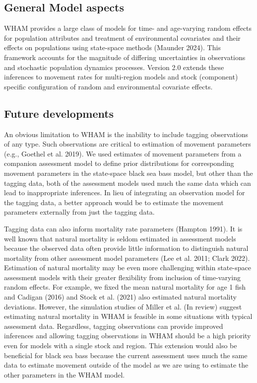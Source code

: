 \documentclass[
]{article}
\begin{document}
\hypertarget{general-model-aspects}{%
\subsection*{General Model aspects}\label{general-model-aspects}}

WHAM provides a large class of models for time- and age-varying random
effects for population attributes and treatment of environmental
covariates and their effects on populations using state-space methods
(Maunder 2024). This framework accounts for the magnitude of differing
uncertainties in observations and stochastic population dynamics
processes. Version 2.0 extends these inferences to movement rates for
multi-region models and stock (component) specific configuration of
random and environmental covariate effects.

\hypertarget{future-developments}{%
\subsection*{Future developments}\label{future-developments}}

An obvious limitation to WHAM is the inability to include tagging
observations of any type. Such observations are critical to estimation
of movement parameters (e.g., Goethel et al. 2019). We used estimates of
movement parameters from a companion assessment model to define prior
distributions for corresponding movement parameters in the state-space
black sea bass model, but other than the tagging data, both of the
assessment models used much the same data which can lead to
inappropriate inferences. In lieu of integrating an observation model
for the tagging data, a better approach would be to estimate the
movement parameters externally from just the tagging data.

Tagging data can also inform mortality rate parameters (Hampton 1991).
It is well known that natural mortality is seldom estimated in
assessment models because the observed data often provide little
information to distinguish natural mortality from other assessment model
parameters (Lee et al. 2011; Clark 2022). Estimation of natural
mortality may be even more challenging within state-space assessment
models with their greater flexibility from inclusion of time-varying
random effects. For example, we fixed the mean natural mortality for age
1 fish and Cadigan (2016) and Stock et al. (2021) also estimated natural
mortality deviations. However, the simulation studies of Miller et al.
(In review) suggest estimating natural mortality in WHAM is feasible in
some situations with typical assessment data. Regardless, tagging
observations can provide improved inferences and allowing tagging
observations in WHAM should be a high priority even for models with a
single stock and region. This extension would also be beneficial for
black sea bass because the current assessment uses much the same data to
estimate movement outside of the model as we are using to estimate the
other parameters in the WHAM model.
\end{document}
